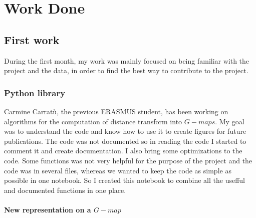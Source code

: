 \chapter{Work Done}
 
\section{First work}

During the first month, my work was mainly focused on being familiar with the
project and the data, in order to find the best way to contribute to the project.

\subsection{Python library}

Carmine Carratù, the previous ERASMUS student, has been working on algorithms for the
computation of distance transform into $G-maps$. My goal was to understand the code
and know how to use it to create figures for future publications. The code was not
documented so in reading the code I started to comment it and create documentation.
I also bring some optimizations to the code. Some functions was not very helpful for
the purpose of the project and the code was in several files, whereas we wanted to
keep the code as simple as possible in one notebook. So I created this notebook to
combine all the usefful and documented functions in one place.

\subsubsection{New representation on a $G-map$}

